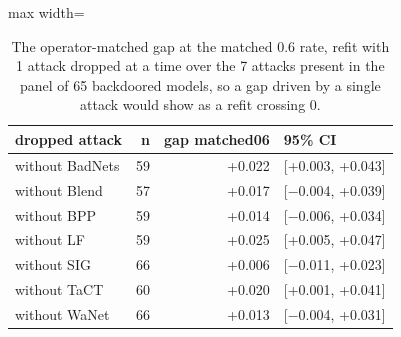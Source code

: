 \begin{table}[htbp]
\centering
\small
\caption{The operator-matched gap at the matched 0.6 rate, refit with 1 attack dropped at a time over the 7 attacks present in the panel of 65 backdoored models, so a gap driven by a single attack would show as a refit crossing 0.}
\label{tab:family-split-loo}
\begin{adjustbox}{max width=\linewidth}
\begin{tabular}{lrrl}
\toprule
dropped attack & n & gap matched06 & 95\% CI \\
\midrule
without BadNets & 59 & +0.022 & [+0.003, +0.043] \\
without Blend & 57 & +0.017 & [$-$0.004, +0.039] \\
without BPP & 59 & +0.014 & [$-$0.006, +0.034] \\
without LF & 59 & +0.025 & [+0.005, +0.047] \\
without SIG & 66 & +0.006 & [$-$0.011, +0.023] \\
without TaCT & 60 & +0.020 & [+0.001, +0.041] \\
without WaNet & 66 & +0.013 & [$-$0.004, +0.031] \\
\bottomrule
\end{tabular}
\end{adjustbox}
\end{table}
